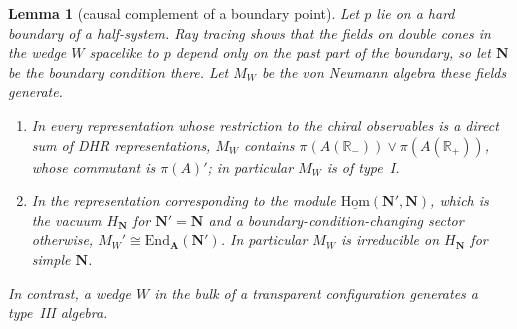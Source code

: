 \documentclass[11pt]{article}
\newtheorem{lemma}[theorem]{Lemma}
\theoremstyle{definition}
\theoremstyle{remark}
\newcommand{\bfA}{\mathbf A}
\begin{document}
\begin{lemma}[causal complement of a boundary point]\label{lem:wedges}
Let $p$ lie on a hard boundary of a half-system. Ray tracing shows that the fields on double cones in the wedge $W$ spacelike to $p$ depend only on the past part of the boundary, so let $\mathbf N$ be the boundary condition there. Let $M_W$ be the von Neumann algebra these fields generate.
\begin{enumerate}[nosep,label=(\alph*)]
\item In every representation whose restriction to the chiral observables is a direct sum of DHR representations, $M_W$ contains $\pi(A(\mathbb R_-))\vee\pi(A(\mathbb R_+))$, whose commutant is $\pi(A)'$; in particular $M_W$ is of type~I.
\item In the representation corresponding to the module $\underline{\mathrm{Hom}}(\mathbf N',\mathbf N)$, which is the vacuum $H_{\mathbf N}$ for $\mathbf N'=\mathbf N$ and a boundary-condition-changing sector otherwise, $M_W'\cong\mathrm{End}_{\bfA}(\mathbf N')$. In particular $M_W$ is irreducible on $H_{\mathbf N}$ for simple $\mathbf N$.
\end{enumerate}
In contrast, a wedge $W$ in the bulk of a transparent configuration generates a type~III algebra.
\end{lemma}
\end{document}
